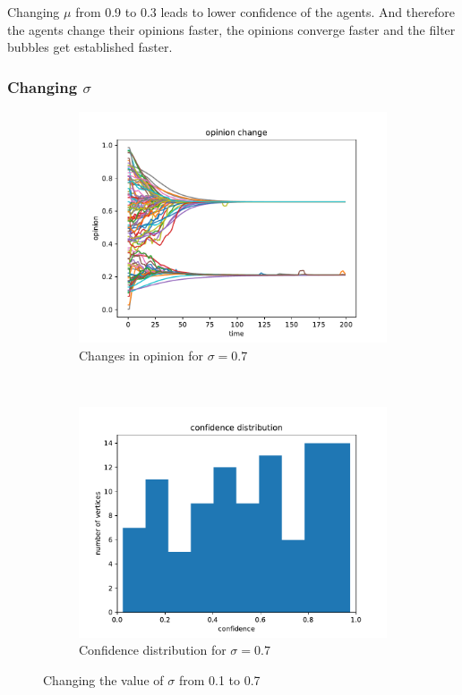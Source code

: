 \documentclass[11pt]{article}
\begin{document}
Changing $\mu$ from 0.9 to 0.3 leads to lower confidence of the agents. And therefore the agents change their opinions faster, the opinions converge faster and the filter bubbles get established faster.

\subsubsection{Changing $\sigma$}

\begin{figure}[H]
    \begin{subfigure}[t]{0.5\textwidth}
    \includegraphics[width = \linewidth]{img/sigma_7.pdf}
    \caption{Changes in opinion for $\sigma=0.7$}\label{sfig:sig7}
    \end{subfigure}
    ~
    \begin{subfigure}[t]{0.5\textwidth}
    \includegraphics[width = \linewidth]{img/sigma_77.pdf}
    \caption{Confidence distribution for $\sigma=0.7$}\label{sfig:sig77}
    \end{subfigure}
    \caption{Changing the value of $\sigma$ from 0.1 to 0.7}\label{sfig:sig1}
\end{figure}
\end{document}
